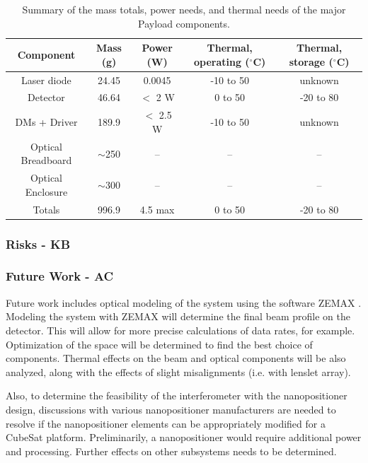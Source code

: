 \documentclass[12pt]{article}
\begin{document}
\begin{table}
\caption{Summary of the mass totals, power needs, and thermal needs of the major Payload components.}
\begin{tabular}{|c||c|c|c|c|} \hline
	\textbf{Component} & \textbf{Mass (g)} & \textbf{Power (W)} & \textbf{Thermal, operating ($^\circ$C)} & \textbf{Thermal, storage ($^\circ$C)} \\ \hline \hline
Laser diode & 24.45 & 0.0045 & -10 to 50 & unknown \\
Detector & 46.64 & $<$ 2 W & 0 to 50 & -20 to 80 \\
DMs + Driver & 189.9 & $<$ 2.5 W & -10 to 50 & unknown \\
Optical Breadboard & $\sim$250 & -- & -- & -- \\
Optical Enclosure & $\sim$300 & -- & -- & -- \\ \hline \hline
Totals & 996.9 & 4.5 max & 0 to 50 & -20 to 80 \\ \hline
\end{tabular}\label{fig:payload_summary_table}
\end{table}

\subsubsection{Risks - KB}


			\subsubsection{Future Work - AC}

Future work includes optical modeling of the system using the software ZEMAX \cite{zemax}. Modeling the system with ZEMAX will determine the
  final beam profile on the detector.  This will allow for more precise calculations of data rates, for example.  Optimization of the space will
  be determined to find the best choice of components.  Thermal
  effects on the beam and optical components will be also analyzed, along with the effects of slight misalignments (i.e. with lenslet array).

Also, to determine the feasibility of the interferometer with the nanopositioner design, discussions with various nanopositioner manufacturers are needed to resolve if the nanopositioner elements can be appropriately modified for a CubeSat platform.  Preliminarily, a nanopositioner would require additional power and processing.  Further effects on other subsystems needs to be determined. 
\end{document}
